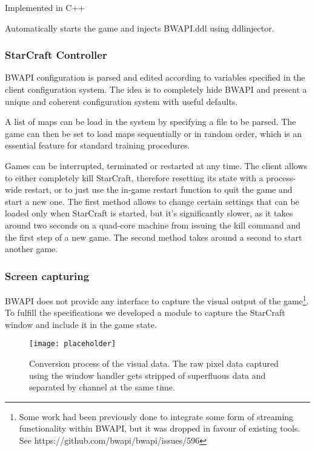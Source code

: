 Implemented in C++

Automatically starts the game and injects BWAPI.ddl using ddlinjector. 

\subsubsection{StarCraft Controller}

BWAPI configuration is parsed and edited according to variables specified in the
client configuration system. The idea is to completely hide BWAPI and present a
unique and coherent configuration system with useful defaults.

A list of maps can be load in the system by specifying a file to be parsed. The
game can then be set to load maps sequentially or in random order, which is an
essential feature for standard training procedures.

Games can be interrupted, terminated or restarted at any time. The client allows
to either completely kill StarCraft, therefore resetting its state with a
process-wide restart, or to just use the in-game restart function to quit the
game and start a new one. The first method allows to change certain settings
that can be loaded only when StarCraft is started, but it's significantly
slower, as it takes around two seconds on a quad-core machine from issuing the
kill command and the first step of a new game. The second method takes around a
second to start another game. %



\subsubsection{Screen capturing}


BWAPI does not provide any interface to capture the visual output of the
game\footnote{Some work had been previously done to integrate some form of
  streaming functionality within BWAPI, but it was dropped in favour of existing
  tools. See https://github.com/bwapi/bwapi/issues/596}. To fulfill the
specifications we developed a module to capture the StarCraft window and include
it in the game state.

\begin{figure}[h]
    \centering
    \texttt{[image: placeholder]}
    \caption{Conversion process of the visual data. The raw pixel data captured
      using the window handler gets stripped of superfluous data and separated
      by channel at the same time.}
    \label{fig:capt_conv}
\end{figure}


